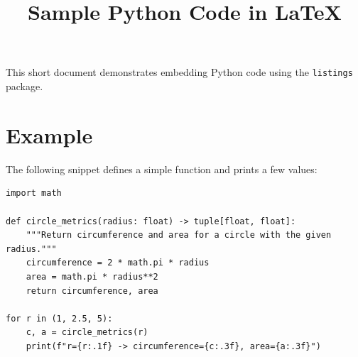 \documentclass{article}
\title{Sample Python Code in \LaTeX}
\author{}
\date{}
\begin{document}
\maketitle

This short document demonstrates embedding Python code using the \texttt{listings} package.

\section*{Example}

The following snippet defines a simple function and prints a few values:

\begin{lstlisting}[style=python, caption={Simple Python sample}]
import math

def circle_metrics(radius: float) -> tuple[float, float]:
    """Return circumference and area for a circle with the given radius."""
    circumference = 2 * math.pi * radius
    area = math.pi * radius**2
    return circumference, area

for r in (1, 2.5, 5):
    c, a = circle_metrics(r)
    print(f"r={r:.1f} -> circumference={c:.3f}, area={a:.3f}")
\end{lstlisting}
\end{document}
